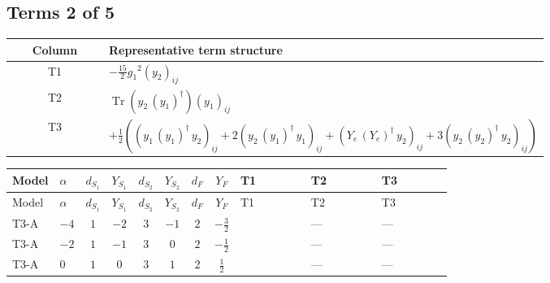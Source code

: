 \documentclass[8pt]{article}
\begin{document}
\begin{landscape}
\subsection*{Terms 2 of 5}
\begin{center}
\begin{tabular}{@{}c >{\raggedright\arraybackslash}p{0.82\linewidth}@{}}
\toprule
Column & Representative term structure \\
\midrule
T1 & \(\displaystyle -\frac{15}{2} {g_1}^2 \left({y_2}\right)_{ij}\) \\
\midrule
T2 & \(\displaystyle \operatorname{Tr}\!\left({y_2}\,\left({y_1}\right)^{\dagger}\right) \left({y_1}\right)_{ij}\) \\
\midrule
T3 & \(\displaystyle +\frac{1}{2} (\left({y_1}\,\left({y_1}\right)^{\dagger}\,{y_2}\right)_{ij}+2 \left({y_2}\,\left({y_1}\right)^{\dagger}\,{y_1}\right)_{ij}+\left({Y_e}\,\left({Y_e}\right)^{\dagger}\,{y_2}\right)_{ij}+3 \left({y_2}\,\left({y_2}\right)^{\dagger}\,{y_2}\right)_{ij})\) \\
\midrule
\bottomrule
\end{tabular}
\end{center}
\smallskip
\tiny
\begin{longtable}{@{}llcccccc >{\raggedright\arraybackslash}p{0.21\linewidth} >{\raggedright\arraybackslash}p{0.21\linewidth} >{\raggedright\arraybackslash}p{0.21\linewidth}@{}}
\toprule
Model & $\alpha$ & $d_{S_1}$ & $Y_{S_1}$ & $d_{S_2}$ & $Y_{S_2}$ & $d_F$ & $Y_F$ & T1 & T2 & T3 \\
\midrule
\endfirsthead
\toprule
Model & $\alpha$ & $d_{S_1}$ & $Y_{S_1}$ & $d_{S_2}$ & $Y_{S_2}$ & $d_F$ & $Y_F$ & T1 & T2 & T3 \\
\midrule
\endhead
T3-A & $-4$ & $1$ & $-2$ & $3$ & $-1$ & $2$ & $-\frac{3}{2}$ & \scriptsize\adjustbox{max width=\linewidth}{$\begin{gathered} -\frac{15}{2} {g_1}^2 \left({y_2}\right)_{ij}\end{gathered}$} & --- & --- \\
\midrule
T3-A & $-2$ & $1$ & $-1$ & $3$ & $0$ & $2$ & $-\frac{1}{2}$ & \scriptsize\adjustbox{max width=\linewidth}{$\begin{gathered} -\frac{3}{2} {g_1}^2 \left({y_2}\right)_{ij}\end{gathered}$} & --- & --- \\
\midrule
T3-A & $0$ & $1$ & $0$ & $3$ & $1$ & $2$ & $\frac{1}{2}$ & \scriptsize\adjustbox{max width=\linewidth}{$\begin{gathered} -\frac{3}{2} {g_1}^2 \left({y_2}\right)_{ij}\end{gathered}$} & --- & --- \\

\end{longtable}
\end{landscape}
\end{document}
